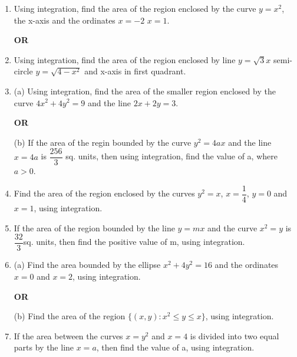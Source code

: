 \begin{enumerate}
\item Using integration, find the area of the region enclosed by the curve $ y=x^2 $, the x-axis and the ordinates $x=-2$  $x=1$.
\begin{center}\textbf{OR}\end{center}

\item Using integration, find the area of the region enclosed by line $y=\sqrt{3}x$ semi-circle $y=\sqrt{4-x^2}$ and x-axis in first quadrant.


\item (a) Using integration, find the area of the smaller region enclosed by the curve ${4x^2 + 4y^2} = 9$ and the line $2x + 2y = 3$.
\begin{center}\textbf{OR}\end{center}

	(b) If the area of the regin bounded by the curve $y^2 = 4ax$ and the line $x = 4a$ is $\dfrac{256}{3}$\hspace{0.2cm} sq. units, then using integration, find the value of a, where $a>0$.


\item Find the area of the region enclosed by the curves $y^2=x$, $x=\dfrac{1}{4}$, $y=0$ and $x=1$, using integration.



\item If the area of the region bounded by the line $y=mx$ and the curve $x^2=y$ is $\dfrac{32}{3}$\hspace{0.2cm}sq. units, then find the positive value of m, using integration.


\item (a) Find the area bounded by the ellipse $x^2+4y^2=16$ and the ordinates $x=0$ and $x=2$, using integration.\begin{center}\textbf{OR}\end{center}


(b) Find the area of the region $\{(x,y): x^2 \leq y \leq x\}$, using integration.


\item If the area between the curves  $x = y^2$ and $x = 4$ is divided into two equal parts by the line $x = a$, then find the value of a, using integration.
\end{enumerate}		
